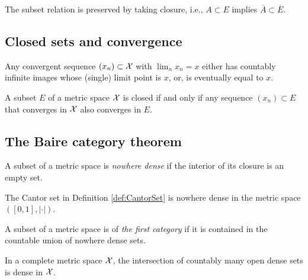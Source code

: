 \begin{coro}
  \label{coro:closurePreserveSubset}
  The subset relation is preserved by taking closure, 
  i.e., $A\subset E$ implies $\overline{A}\subset \overline{E}$.
\end{coro}

\subsection{Closed sets and convergence}
\label{sec:clos-sets-conv}

\begin{lem}
  \label{lem:converge2cases}
  Any convergent sequence $(x_n)\subset{\cal X}$ with $\lim_n x_n =x$
  either has countably infinite images whose (single) limit point is
  $x$, 
  or, is eventually equal to $x$.
\end{lem}

\begin{lem}
  \label{lem:closedSetConvergence}
  A subset $E$ of a metric space ${\cal X}$ is closed
  if and only if any sequence $(x_n)\subset E$
  that converges in ${\cal X}$ also converges in $E$.
\end{lem}

\subsection{The Baire category theorem}

\begin{defn}
  \label{def:nowhereDense}
  A subset of a metric space is \emph{nowhere dense}
  if the interior of its closure is an empty set.
\end{defn}

\begin{exm}
  The Cantor set in Definition \ref{def:CantorSet}
  is nowhere dense in the metric space $([0,1],|\cdot|)$.
\end{exm}

\begin{defn}
  \label{def:metricSpaceFirstCat}
  A subset of a metric space is of \emph{the first category}
  if it is contained in the countable union of nowhere dense sets.
\end{defn}

\begin{thm}
  \label{thm:BaireCat}
  In a complete metric space ${\cal X}$,
  the intersection of countably many open dense sets is dense in ${\cal X}$.
\end{thm}

